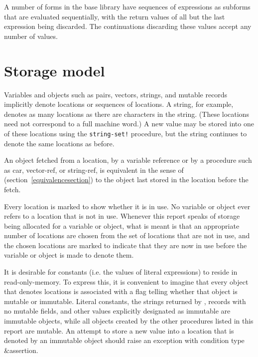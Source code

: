 A number of forms in the base library have sequences of expressions
as subforms that are evaluated sequentially, with the return values of
all but the last expression being discarded.  The continuations
discarding these values accept any number of values.

\section{Storage model}
\label{storagemodel}

Variables and objects such as pairs, vectors, strings, and mutable records implicitly
denote locations or sequences of locations.  A string, for
example, denotes as many locations as there are characters in the string. 
(These locations need not correspond to a full machine word.) A new value may be
stored into one of these locations using the {\tt string-set!} procedure, but
the string continues to denote the same locations as before.

An object fetched from a location, by a variable reference or by
a procedure such as {\cf car}, {\cf vector-ref}, or {\cf string-ref}, is
equivalent in the sense of  %
(section~\ref{equivalencesection})
to the object last stored in the location before the fetch.

Every location is marked to show whether it is in use.
No variable or object ever refers to a location that is not in use.
Whenever this report speaks of storage being allocated for a variable
or object, what is meant is that an appropriate number of locations are
chosen from the set of locations that are not in use, and the chosen
locations are marked to indicate that they are now in use before the variable
or object is made to denote them.

It is desirable for constants (i.e. the values of
literal expressions) to reside in read-only-memory.  To express this,
it is convenient to imagine that every object that denotes locations
is associated with a flag telling whether that object is
mutable or immutable.  Literal
constants, the strings returned by , records with
no mutable fields, and other values explicitly designated as immutable
are immutable objects, while all objects created by the other
procedures listed in this report are mutable.  An attempt to store a
new value into a location that is denoted by an immutable object
should raise an exception with condition type {\cf\&assertion}.

